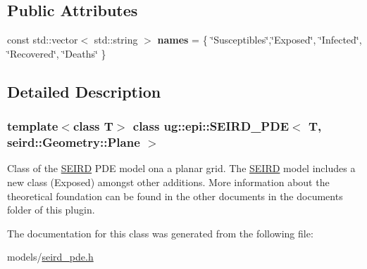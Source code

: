 \subsection*{Public Attributes}
\begin{DoxyCompactItemize}
\item 
\mbox{\label{classug_1_1epi_1_1_s_e_i_r_d___p_d_e_3_01_t_00_01seird_1_1_geometry_1_1_plane_01_4_a38c997d8d89e2fece3bb806ecf841c57}} 
const std\+::vector$<$ std\+::string $>$ {\bfseries names} = \{ \char`\"{}Susceptibles\char`\"{},\char`\"{}Exposed\char`\"{}, \char`\"{}Infected\char`\"{}, \char`\"{}Recovered\char`\"{}, \char`\"{}Deaths\char`\"{} \}
\end{DoxyCompactItemize}


\subsection{Detailed Description}
\subsubsection*{template$<$class T$>$\newline
class ug\+::epi\+::\+S\+E\+I\+R\+D\+\_\+\+P\+D\+E$<$ T, seird\+::\+Geometry\+::\+Plane $>$}

Class of the \hyperlink{classug_1_1epi_1_1_s_e_i_r_d}{S\+E\+I\+RD} P\+DE model ona a planar grid. The \hyperlink{classug_1_1epi_1_1_s_e_i_r_d}{S\+E\+I\+RD} model includes a new class (Exposed) amongst other additions. More information about the theoretical foundation can be found in the other documents in the documents folder of this plugin. 

The documentation for this class was generated from the following file\+:\begin{DoxyCompactItemize}
\item 
models/\hyperlink{seird__pde_8h}{seird\+\_\+pde.\+h}\end{DoxyCompactItemize}
